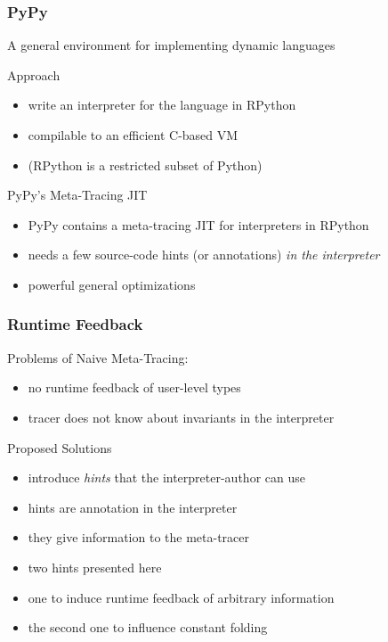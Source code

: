 \documentclass[utf8x]{beamer}
\begin{document}
\begin{frame}
  \frametitle{PyPy}
  A general environment for implementing dynamic languages
  \pause
  \begin{block}{Approach}
      \begin{itemize}
          \item write an interpreter for the language in RPython
          \item compilable to an efficient C-based VM
          \pause
          \item (RPython is a restricted subset of Python)
      \end{itemize}
  \end{block}
  \pause
  \begin{block}{PyPy's Meta-Tracing JIT}
      \begin{itemize}
          \item PyPy contains a meta-tracing JIT for interpreters in RPython
          \item needs a few source-code hints (or annotations) \emph{in the interpreter}
          \item powerful general optimizations
      \end{itemize}
  \end{block}
\end{frame}

\begin{frame}
  \frametitle{Runtime Feedback}
  Problems of Naive Meta-Tracing:
  \begin{itemize}
      \item no runtime feedback of user-level types
      \item tracer does not know about invariants in the interpreter
  \end{itemize}
  \pause
  \begin{block}{Proposed Solutions}
      \begin{itemize}
          \item introduce \textit{hints} that the interpreter-author can use
          \item hints are annotation in the interpreter
          \item they give information to the meta-tracer
          \pause
          \item two hints presented here
          \item one to induce runtime feedback of arbitrary information
          \item the second one to influence constant folding
      \end{itemize}
  \end{block}
\end{frame}
\end{document}
